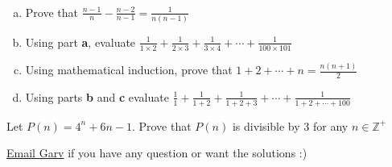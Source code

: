 \documentclass[11pt]{article}
\newenvironment{problem}[2][Problem]{\begin{trivlist}
\item[\hskip \labelsep {\bfseries #1}\hskip \labelsep {\bfseries #2.}]}{\end{trivlist}}
\begin{document}
\begin{problem}{4}\
	\begin{enumerate}[a.]
		\item Prove that $\frac{n-1}{n}-\frac{n-2}{n-1}=\frac{1}{n(n-1)}$
		\item Using part \textbf{a}, evaluate $\frac{1}{1\times2}+\frac{1}{2\times3}+\frac{1}{3\times4}+\cdots+\frac{1}{100\times101}$
		\item Using mathematical induction, prove that $1+2+\cdots+n=\frac{n(n+1)}{2}$
		\item Using parts \textbf{b} and \textbf{c} evaluate $\frac{1}{1}+\frac{1}{1+2}+\frac{1}{1+2+3}+\cdots+\frac{1}{1+2+\cdots+100}$
	\end{enumerate}
\end{problem}

\begin{problem}{5}
	Let $P(n)=4^{n}+6n-1$. Prove that $P(n)$ is divisible by 3 for any $n \in \mathbb{Z}^{+}$
\end{problem}

\href{mailto:GarvShah@caulfieldgs.vic.edu.au}{Email Garv} if you have any question or want the solutions :)
\end{document}
